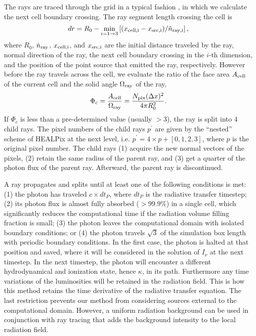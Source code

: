The rays are traced through the grid in a typical fashion
\citep[e.g.][]{Abel99_RT}, in which we calculate the next cell
boundary crossing.  The ray segment length crossing the cell is
%
\begin{equation}
  \label{eqn:trace}
  dr = R_0 - \min_{i=1 \rightarrow 3} \left[(x_{\rm cell,i} - x_{\rm src,i}) /
    \hat{n}_{\rm ray,i} \right],
\end{equation}
%
where $R_0$, $\hat{n}_{\rm ray}$, $x_{\rm cell,i}$, and $x_{\rm
  src,i}$ are the initial distance traveled by the ray, normal
direction of the ray, the next cell boundary crossing in the $i$-th
dimension, and the position of the point source that emitted the ray,
respectively.  However before the ray travels across the cell, we
evaluate the ratio of the face area $A_{\rm cell}$ of the current cell
and the solid angle $\Omega_{\rm ray}$ of the ray,
%
\begin{equation}
  \label{eqn:split}
  \Phi_c = \frac{A_{\rm cell}} {\Omega_{\rm ray}} = 
  \frac{N_{\rm pix} (\Delta x)^2} {4\pi R_0^2}.
\end{equation}
%
If $\Phi_c$ is less than a pre-determined value (usually $>3$), the
ray is split into 4 child rays.  The pixel numbers of the child rays
$p^\prime$ are given by the ``nested'' scheme of HEALPix at the next
level, i.e. $p^\prime = 4 \times p + [0,1,2,3]$, where $p$ is the
original pixel number.  The child rays (1) acquire the new normal
vectors of the pixels, (2) retain the same radius of the parent ray,
and (3) get a quarter of the photon flux of the parent ray.
Afterward, the parent ray is discontinued.

A ray propagates and splits until at least one of the following conditions is met: (1) the photon has traveled $c
\times dt_P$, where $dt_P$ is the radiative transfer timestep; (2) its
photon flux is almost fully absorbed ($>99.9\%$) in a single cell,
which significantly reduces the computational time if the radiation
volume filling fraction is small; (3) the photon leaves the
computational domain with isolated boundary conditions; or (4) the
photon travels $\sqrt{3}$ of the simulation box length with periodic
boundary conditions.
In the first case, the photon is halted at that position and saved,
where it will be considered in the solution of $I_\nu$ at the next
timestep.  In the next timestep, the photon will encounter a different
hydrodynamical and ionization state, hence $\kappa$, in its path.
Furthermore any time variations of the luminosities will be retained
in the radiation field.  This is how this method retains the time
derivative of the radiative transfer equation.  The last restriction
prevents our method from considering sources external to the
computational domain. However, a uniform radiation background can be used
in conjunction with ray tracing that adds the background intensity to the
local radiation field. 

